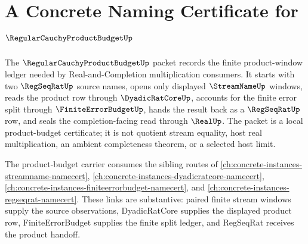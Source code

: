 \chapter{A Concrete Naming Certificate for $\RegularCauchyProductBudgetUp$}
\label{ch:concrete-instances-regularcauchyproductbudget-namecert}

The $\RegularCauchyProductBudgetUp$ packet records the finite product-window ledger needed by Real-and-Completion multiplication consumers. It starts with two $\RegSeqRatUp$ source names, opens only displayed $\StreamNameUp$ windows, reads the product row through $\DyadicRatCoreUp$, accounts for the finite error split through $\FiniteErrorBudgetUp$, hands the result back as a $\RegSeqRatUp$ row, and seals the completion-facing read through $\RealUp$. The packet is a local product-budget certificate; it is not quotient stream equality, host real multiplication, an ambient completeness theorem, or a selected host limit.

The product-budget carrier consumes the sibling routes of \autoref{ch:concrete-instances-streamname-namecert}, \autoref{ch:concrete-instances-dyadicratcore-namecert}, \autoref{ch:concrete-instances-finiteerrorbudget-namecert}, and \autoref{ch:concrete-instances-regseqrat-namecert}. These links are substantive: paired finite stream windows supply the source observations, DyadicRatCore supplies the displayed product row, FiniteErrorBudget supplies the finite split ledger, and RegSeqRat receives the product handoff.

